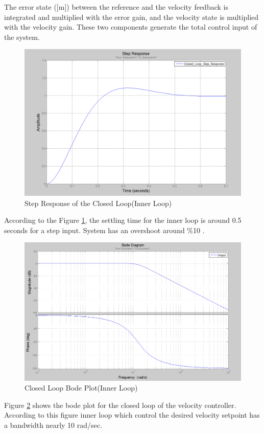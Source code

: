 The error state ([m]) between the reference and the velocity feedback is integrated and multiplied with the error gain, and the velocity state is multiplied with the velocity gain. These two components generate the total control input of the system.  

\begin{figure}[H]
\caption{Step Response of the Closed Loop(Inner Loop)} \label{Stepresp}
\centering
\includegraphics[scale = 0.40]{step_resp}
\end{figure}

According to the Figure \ref{Stepresp}, the settling time for the inner loop is around 0.5 seconds for a step input. System has an overshoot around $\%$10 .

\begin{figure}[H]
\caption{Closed Loop Bode Plot(Inner Loop)} \label{ClosedLoop}
\centering
\includegraphics[scale = 0.30]{closed_loop}
\end{figure}

Figure \ref{ClosedLoop} shows the bode plot for the closed loop of the velocity controller. According to this figure inner loop which control the desired velocity setpoint has a bandwidth nearly 10 rad/sec.